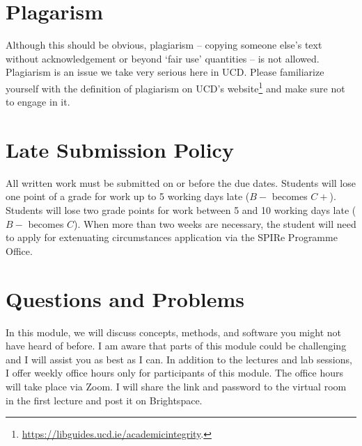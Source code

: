 \documentclass[abstract=on,parskip=full,headings=standardclasses,fontsize=11pt,paper=a4]{scrartcl}
\begin{document}
\section*{Plagarism}

Although this should be obvious, plagiarism -- copying someone else's text without acknowledgement or beyond `fair use' quantities -- is not allowed. Plagiarism is an issue we take very serious here in UCD. Please familiarize yourself with the definition of plagiarism on UCD's website\footnote{\url{https://libguides.ucd.ie/academicintegrity}.} and make sure not to engage in it.



\section*{Late Submission Policy}

All written work must be submitted on or before the due dates. Students will lose one point of a grade for work up to 5 working days late ($B-$ becomes $C+$). Students will lose two grade points for work between 5 and 10 working days late ($B-$ becomes $C$). When more than two weeks are necessary, the student will need to apply for extenuating circumstances application via the SPIRe Programme Office.


\section*{Questions and Problems}

In this module, we will discuss concepts, methods, and software you might not have heard of before. I am  aware that parts of this module could be challenging and I will assist you as best as I can. In addition to the lectures and lab sessions, I  offer weekly office hours only  for  participants of this module. The office hours will take place via Zoom. I will share the link and password to the virtual room in the first lecture and post it on Brightspace. 
\end{document}
